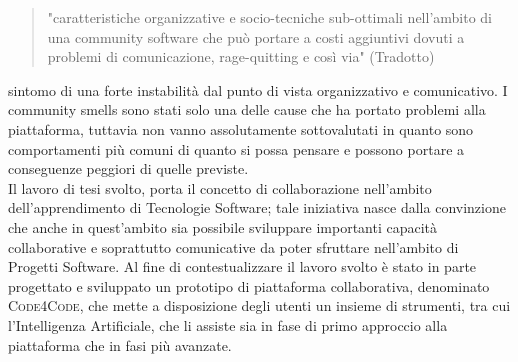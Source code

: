 \begin{quotation}
"caratteristiche organizzative e socio-tecniche sub-ottimali nell'ambito di una community software che può portare a costi aggiuntivi dovuti a problemi di comunicazione, rage-quitting e così via" (Tradotto)
\cite{CommunitySmells}   
\end{quotation}
sintomo di una forte instabilità dal punto di vista organizzativo e comunicativo. I community smells sono stati solo una delle cause che ha portato problemi alla piattaforma, tuttavia non vanno assolutamente sottovalutati in quanto sono comportamenti più comuni di quanto si possa pensare e possono portare a conseguenze peggiori di quelle previste.\\
Il lavoro di tesi svolto, porta il concetto di collaborazione nell'ambito dell'apprendimento di Tecnologie Software; tale iniziativa nasce dalla convinzione che anche in quest'ambito sia possibile sviluppare importanti capacità collaborative e soprattutto comunicative da poter sfruttare nell'ambito di Progetti Software. Al fine di contestualizzare il lavoro svolto è stato in parte progettato e sviluppato un prototipo di piattaforma collaborativa, denominato \textsc{Code4Code}, che mette a disposizione degli utenti un insieme di strumenti, tra cui l'Intelligenza Artificiale, che li assiste sia in fase di primo approccio alla piattaforma che in fasi più avanzate.  
